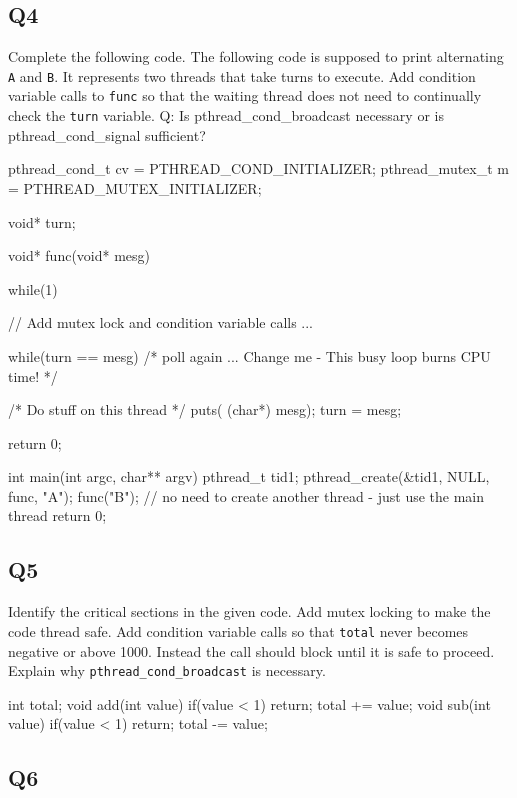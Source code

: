 \subsection{Q4}\label{q4}

Complete the following code. The following code is supposed to print alternating \texttt{A} and \texttt{B}. It represents two threads that take turns to execute. Add condition variable calls to \texttt{func} so that the waiting thread does not need to continually check the \texttt{turn} variable. Q: Is pthread\_cond\_broadcast necessary or is pthread\_cond\_signal sufficient?

\begin{code}[language=C]
pthread_cond_t cv = PTHREAD_COND_INITIALIZER;
pthread_mutex_t m = PTHREAD_MUTEX_INITIALIZER;

void* turn;

void* func(void* mesg) {
  while(1) {
// Add mutex lock and condition variable calls ...

    while(turn == mesg) { 
        /* poll again ... Change me - This busy loop burns CPU time! */ 
    }

    /* Do stuff on this thread */
    puts( (char*) mesg);
    turn = mesg;
    
  }
  return 0;
}

int main(int argc, char** argv){
  pthread_t tid1;
  pthread_create(&tid1, NULL, func, "A");
  func("B"); // no need to create another thread - just use the main thread
  return 0;
}
\end{code}

\subsection{Q5}\label{q5}

Identify the critical sections in the given code. Add mutex locking to make the code thread safe. Add condition variable calls so that \texttt{total} never becomes negative or above 1000. Instead the call should block until it is safe to proceed. Explain why \texttt{pthread\_cond\_broadcast} is necessary.

\begin{code}[language=C]
int total;
void add(int value) {
 if(value < 1) return;
 total += value;
}
void sub(int value) {
 if(value < 1) return;
 total -= value;
}
\end{code}

\subsection{Q6}\label{q6}

